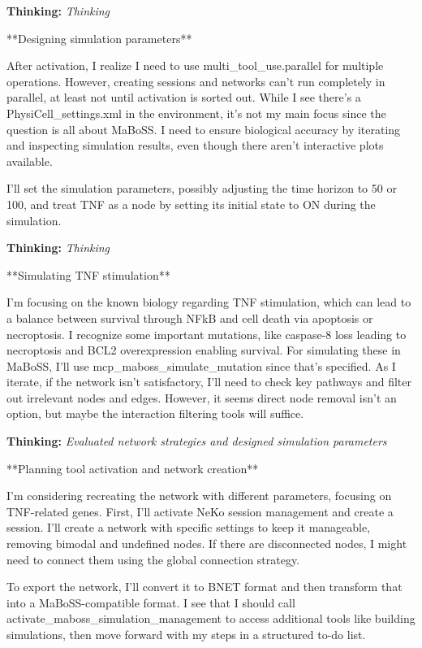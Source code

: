 \documentclass[11pt,a4paper]{article}
\begin{document}
\begin{thinkbox}
\textbf{Thinking:} \textit{Thinking}

**Designing simulation parameters**

After activation, I realize I need to use multi\_tool\_use.parallel for multiple operations. However, creating sessions and networks can’t run completely in parallel, at least not until activation is sorted out. While I see there’s a PhysiCell\_settings.xml in the environment, it’s not my main focus since the question is all about MaBoSS. I need to ensure biological accuracy by iterating and inspecting simulation results, even though there aren’t interactive plots available.

I'll set the simulation parameters, possibly adjusting the time horizon to 50 or 100, and treat TNF as a node by setting its initial state to ON during the simulation.

\end{thinkbox}
\begin{thinkbox}
\textbf{Thinking:} \textit{Thinking}

**Simulating TNF stimulation**

I'm focusing on the known biology regarding TNF stimulation, which can lead to a balance between survival through NFkB and cell death via apoptosis or necroptosis. I recognize some important mutations, like caspase-8 loss leading to necroptosis and BCL2 overexpression enabling survival. For simulating these in MaBoSS, I’ll use mcp\_maboss\_simulate\_mutation since that’s specified. As I iterate, if the network isn’t satisfactory, I’ll need to check key pathways and filter out irrelevant nodes and edges. However, it seems direct node removal isn’t an option, but maybe the interaction filtering tools will suffice.

\end{thinkbox}
\begin{thinkbox}
\textbf{Thinking:} \textit{Evaluated network strategies and designed simulation parameters}

**Planning tool activation and network creation**

I’m considering recreating the network with different parameters, focusing on TNF-related genes. First, I’ll activate NeKo session management and create a session. I’ll create a network with specific settings to keep it manageable, removing bimodal and undefined nodes. If there are disconnected nodes, I might need to connect them using the global connection strategy.

To export the network, I’ll convert it to BNET format and then transform that into a MaBoSS-compatible format. I see that I should call activate\_maboss\_simulation\_management to access additional tools like building simulations, then move forward with my steps in a structured to-do list.

\end{thinkbox}
\end{document}
